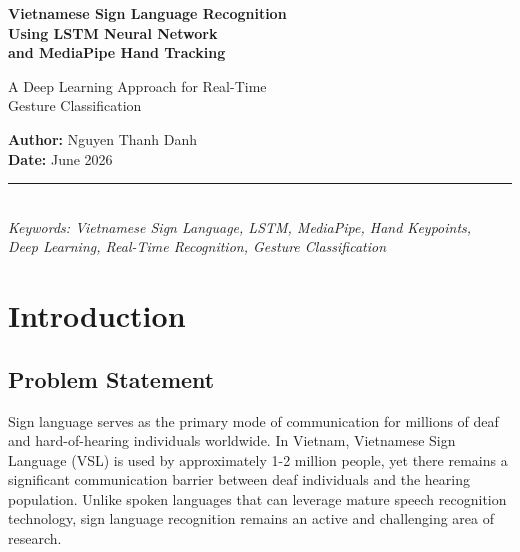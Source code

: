 \documentclass[12pt, a4paper]{article}
\begin{document}
\begin{titlepage}
    \centering
    \vspace*{2cm}
    {\Huge\bfseries Vietnamese Sign Language Recognition\\[0.3cm]
    Using LSTM Neural Network\\[0.3cm]
    and MediaPipe Hand Tracking\par}
    \vspace{1.5cm}
    {\Large A Deep Learning Approach for Real-Time\\
    Gesture Classification\par}
    \vspace{2cm}
    {\large
    \textbf{Author:} Nguyen Thanh Danh\\[0.5cm]
    \textbf{Date:} June 2026\\[0.5cm]
    }
    \vspace{2cm}
    \rule{\textwidth}{0.4pt}\\[0.5cm]
    {\large\itshape
    Keywords: Vietnamese Sign Language, LSTM, MediaPipe, Hand Keypoints,\\
    Deep Learning, Real-Time Recognition, Gesture Classification
    }
    \vfill
\end{titlepage}

\tableofcontents
\newpage

\section{Introduction}
\label{sec:introduction}

\subsection{Problem Statement}

Sign language serves as the primary mode of communication for millions of deaf and hard-of-hearing individuals worldwide. In Vietnam, Vietnamese Sign Language (VSL) is used by approximately 1-2 million people, yet there remains a significant communication barrier between deaf individuals and the hearing population. Unlike spoken languages that can leverage mature speech recognition technology, sign language recognition remains an active and challenging area of research.
\end{document}
